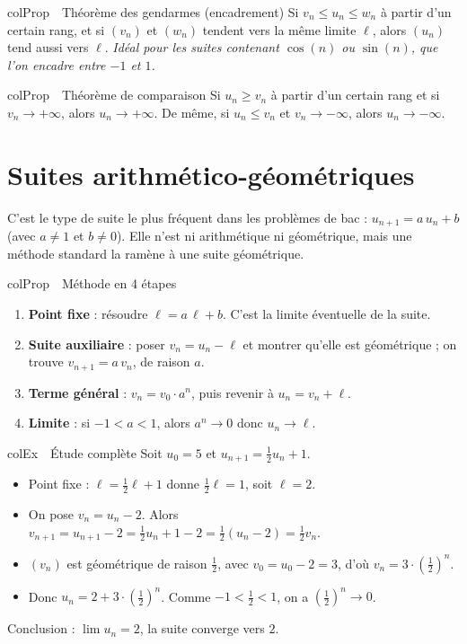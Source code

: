 \documentclass[11pt,a4paper]{article}
\newenvironment{propriete}[1][Propriété]
  {\begin{fiche}{colProp}{\ding{72}~~#1}}{\end{fiche}}
\newenvironment{exemple}[1][Exemple]
  {\begin{fiche}{colEx}{\ding{217}~~#1}}{\end{fiche}}
\begin{document}
\begin{propriete}[Théorème des gendarmes (encadrement)]
Si $v_n \leq u_n \leq w_n$ à partir d'un certain rang, et si $(v_n)$ et $(w_n)$ tendent vers la même limite $\ell$, alors $(u_n)$ tend aussi vers $\ell$. \emph{Idéal pour les suites contenant $\cos(n)$ ou $\sin(n)$, que l'on encadre entre $-1$ et $1$.}
\end{propriete}

\begin{propriete}[Théorème de comparaison]
Si $u_n \geq v_n$ à partir d'un certain rang et si $v_n \to +\infty$, alors $u_n \to +\infty$. De même, si $u_n \leq v_n$ et $v_n \to -\infty$, alors $u_n \to -\infty$.
\end{propriete}

\section{Suites arithmético-géométriques}

C'est le type de suite le plus fréquent dans les problèmes de bac : $u_{n+1} = a\,u_n + b$ (avec $a \neq 1$ et $b \neq 0$). Elle n'est ni arithmétique ni géométrique, mais une méthode standard la ramène à une suite géométrique.

\begin{propriete}[Méthode en 4 étapes]
\begin{enumerate}[leftmargin=8mm, itemsep=1mm]
  \item \textbf{Point fixe} : résoudre $\ell = a\,\ell + b$. C'est la limite éventuelle de la suite.
  \item \textbf{Suite auxiliaire} : poser $v_n = u_n - \ell$ et montrer qu'elle est géométrique ; on trouve $v_{n+1} = a\,v_n$, de raison $a$.
  \item \textbf{Terme général} : $v_n = v_0 \cdot a^n$, puis revenir à $u_n = v_n + \ell$.
  \item \textbf{Limite} : si $-1 < a < 1$, alors $a^n \to 0$ donc $u_n \to \ell$.
\end{enumerate}
\end{propriete}

\begin{exemple}[Étude complète]
Soit $u_0 = 5$ et $u_{n+1} = \frac{1}{2}u_n + 1$.
\begin{itemize}[leftmargin=6mm, itemsep=0.5mm]
  \item Point fixe : $\ell = \frac{1}{2}\ell + 1$ donne $\frac{1}{2}\ell = 1$, soit $\ell = 2$.
  \item On pose $v_n = u_n - 2$. Alors $v_{n+1} = u_{n+1} - 2 = \frac{1}{2}u_n + 1 - 2 = \frac{1}{2}(u_n - 2) = \frac{1}{2}v_n$.
  \item $(v_n)$ est géométrique de raison $\frac{1}{2}$, avec $v_0 = u_0 - 2 = 3$, d'où $v_n = 3 \cdot \left(\frac{1}{2}\right)^n$.
  \item Donc $u_n = 2 + 3 \cdot \left(\frac{1}{2}\right)^n$. Comme $-1 < \frac{1}{2} < 1$, on a $\left(\frac{1}{2}\right)^n \to 0$.
\end{itemize}
Conclusion : $\lim u_n = 2$, la suite converge vers $2$.
\end{exemple}
\end{document}

